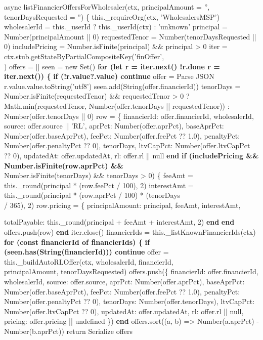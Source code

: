 \documentclass[12pt]{article}
\begin{document}
\begin{algorithm}[H]
\caption{updateWholesalerScoreOnSettlement() (Part 1 of 2)}
async listFinancierOffersForWholesaler(ctx, principalAmount = '',\\
\quad tenorDaysRequested = '') \{\;
this.\_requireOrg(ctx, 'WholesalersMSP')\;
wholesalerId = this.\_userId ? this.\_userId(ctx) : 'unknown'\;
principal = Number(principalAmount || 0)\;
requestedTenor = Number(tenorDaysRequested || 0)\;
includePricing = Number.isFinite(principal) \&\& principal > 0\;
iter = ctx.stub.getStateByPartialCompositeKey('finOffer',\\
)\;
offers = []\;
seen = new Set()\;
\textbf{for (let r = iter.next() !r.done r = iter.next()) \{}\;
\textbf{if (!r.value?.value) continue}\;
offer = Parse JSON r.value.value.toString('utf8')\;
seen.add(String(offer.financierId))\;
tenorDays = Number.isFinite(requestedTenor) \&\& requestedTenor > 0\;
? Math.min(requestedTenor, Number(offer.tenorDays || requestedTenor))\;
: Number(offer.tenorDays || 0)\;
row = \{\;
financierId: offer.financierId,\;
wholesalerId,\;
source: offer.source || 'RL',\;
aprPct: Number(offer.aprPct),\;
baseAprPct: Number(offer.baseAprPct),\;
feePct: Number(offer.feePct ?? 1.0),\;
penaltyPct: Number(offer.penaltyPct ?? 0),\;
tenorDays,\;
ltvCapPct: Number(offer.ltvCapPct ?? 0),\;
updatedAt: offer.updatedAt,\;
rl: offer.rl || null\;
\textbf{end}\;
\textbf{if (includePricing \&\& Number.isFinite(row.aprPct) \&\&}\\
\quad Number.isFinite(tenorDays) \&\& tenorDays > 0) \{\;
feeAmt = this.\_round(principal * (row.feePct / 100), 2)\;
interestAmt = this.\_round(principal * (row.aprPct / 100) * (tenorDays\\
\quad / 365), 2)\;
row.pricing = \{\;
principalAmount: principal,\;
feeAmt,\;
interestAmt,\;
\end{algorithm}


\begin{algorithm}[H]
\caption{updateWholesalerScoreOnSettlement() (Part 2 of 2)}
totalPayable: this.\_round(principal + feeAmt + interestAmt, 2)\;
\textbf{end}\;
\textbf{end}\;
offers.push(row)\;
\textbf{end}\;
iter.close()\;
financierIds = this.\_listKnownFinancierIds(ctx)\;
\textbf{for (const financierId of financierIds) \{}\;
\textbf{if (seen.has(String(financierId))) continue}\;
offer = this.\_buildAutoRLOffer(ctx, wholesalerId, financierId,\\
\quad principalAmount, tenorDaysRequested)\;
offers.push(\{\;
financierId: offer.financierId,\;
wholesalerId,\;
source: offer.source,\;
aprPct: Number(offer.aprPct),\;
baseAprPct: Number(offer.baseAprPct),\;
feePct: Number(offer.feePct ?? 1.0),\;
penaltyPct: Number(offer.penaltyPct ?? 0),\;
tenorDays: Number(offer.tenorDays),\;
ltvCapPct: Number(offer.ltvCapPct ?? 0),\;
updatedAt: offer.updatedAt,\;
rl: offer.rl || null,\;
pricing: offer.pricing || undefined\;
\})\;
\textbf{end}\;
offers.sort((a, b) => Number(a.aprPct) - Number(b.aprPct))\;
return Serialize offers\;
\end{algorithm}
\end{document}
